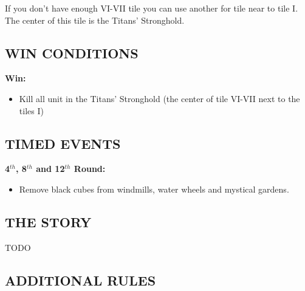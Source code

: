 \begin{multicols*}{2}
If you don't have enough VI-VII tile you can use another for tile near to tile I.
The center of this tile is the Titans' Stronghold.

\columnbreak

\subsection*{\MakeUppercase{Win conditions}}

\textbf{Win:}
\begin{itemize}
	\item Kill all unit in the Titans' Stronghold (the center of tile VI-VII next to the tiles I)
\end{itemize}

\subsection*{\MakeUppercase{Timed events}}

\textbf{4$^{th}$, 8$^{th}$ and 12$^{th}$ Round:}
\begin{itemize}
	\item Remove black cubes from windmills, water wheels and mystical gardens.
\end{itemize}

\subsection*{\MakeUppercase{The story}}

TODO \end{multicols*}

\newpage

\subsection*{\MakeUppercase{Additional rules}}

